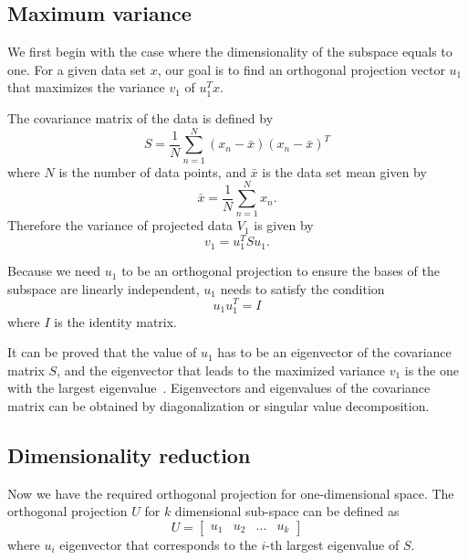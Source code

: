 \subsection{Maximum variance}
\label{Maximum variance}
We first begin with the case where the dimensionality of the subspace equals to one. For a given data set $x$, our goal is to find an orthogonal projection vector $u_1$ that maximizes the variance $v_1$ of $u_1^Tx$. 

The covariance matrix of the data is defined by
\begin{equation}
	S = \frac{1}{N}\sum\limits_{n=1}^N(x_n-\bar{x})(x_n-\bar{x})^T
\end{equation}
where $N$ is the number of data points, and $\bar{x}$ is the data set mean given by
\begin{equation}
	\bar{x} = \frac{1}{N}\sum\limits_{n=1}^Nx_n.
\end{equation}
Therefore the variance of projected data $V_1$ is given by
\begin{equation}
	v_1 = u_1^TSu_1.
\end{equation}

Because we need $u_1$ to be an orthogonal projection to ensure the bases of the subspace are linearly independent, $u_1$ needs to satisfy the condition 
\begin{equation}
	u_1u_1^T=I
\end{equation}
where $I$ is the identity matrix. 

It can be proved that the value of $u_1$ has to be an eigenvector of the covariance matrix $S$, and the eigenvector that leads to the maximized variance $v_1$ is the one with the largest eigenvalue~\cite{bishop2006pattern}. Eigenvectors and eigenvalues of the covariance matrix can be obtained by diagonalization or singular value decomposition.

\subsection{Dimensionality reduction}
\label{Dimensionality reduction}

Now we have the required orthogonal projection for one-dimensional space. The orthogonal projection $U$ for $k$ dimensional sub-space can be defined as
\begin{equation}
	U=
	\begin{bmatrix}
		u_1 & u_2 & 	... & u_k
	\end{bmatrix}
\end{equation}
where $u_i$ eigenvector that corresponds to the $i$-th largest eigenvalue of $S$. 

